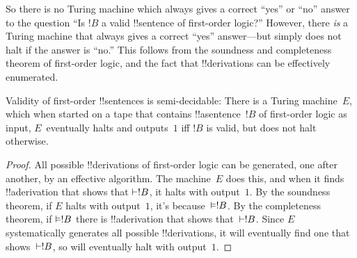 \documentclass[../../../include/open-logic-section]{subfiles}
\begin{document}
\begin{explain}
So there is no Turing machine which always gives a
correct ``yes'' or ``no'' answer to the question ``Is $!B$ a valid
!!{sentence} of first-order logic?'' However, there \emph{is} a Turing
machine that always gives a correct ``yes'' answer---but simply does
not halt if the answer is ``no.'' This follows from the soundness and
completeness theorem of first-order logic, and the fact that
!!{derivation}s can be effectively enumerated.
\end{explain}

\begin{thm}
  Validity of first-order !!{sentence}s is semi-decidable: There is a
  Turing machine~$E$, which when started on a tape that contains
  !!a{sentence}~$!B$ of first-order logic as input, $E$~eventually
  halts and outputs~$1$ iff $!B$ is valid, but does not halt
  otherwise.
\end{thm}

\begin{proof}
  All possible !!{derivation}s of first-order logic can be generated,
  one after another, by an effective algorithm.  The machine~$E$ does
  this, and when it finds !!a{derivation} that shows that $\Proves
  !B$, it halts with output~$1$. By the soundness theorem, if $E$
  halts with output~$1$, it's because~$\Entails !B$. By the
  completeness theorem, if $\Entails !B$ there is !!a{derivation} that
  shows that~$\Proves !B$. Since $E$ systematically generates all
  possible !!{derivation}s, it will eventually find one that
  shows~$\Proves !B$, so will eventually halt with output~$1$.
\end{proof}
\end{document}

